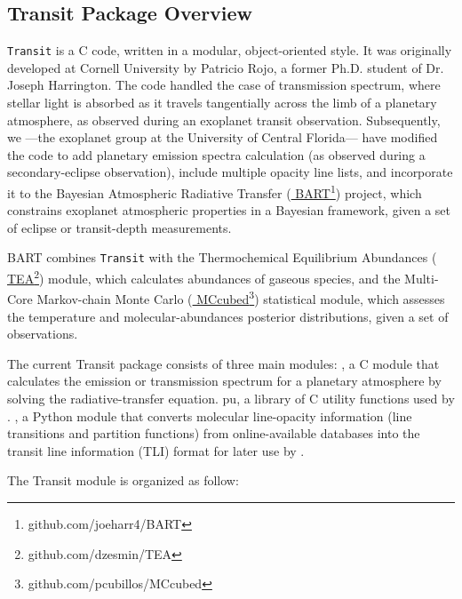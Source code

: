 \documentclass[letterpaper, 12pt]{article}
\begin{document}
\subsection{Transit Package Overview}

{\tt Transit} is a C code, written in a modular, object-oriented
style.  It was originally developed at Cornell University by Patricio
Rojo, a former Ph.D. student of Dr. Joseph Harrington.  The code
handled the case of transmission spectrum, where stellar light is
absorbed as it travels tangentially across the limb of a planetary
atmosphere, as observed during an exoplanet transit observation.
Subsequently, we ---the exoplanet group at the University of Central
Florida--- have modified the code to add planetary emission spectra
calculation (as observed during a secondary-eclipse observation),
include multiple opacity line lists, and incorporate it to the
Bayesian Atmospheric Radiative Transfer
(\href{https://github.com/joeharr4/BART} {\tttm
  BART}\footnote{github.com/joeharr4/BART}) project, which constrains
exoplanet atmospheric properties in a Bayesian framework, given a set
of eclipse or transit-depth measurements.
  

{\tttm BART} combines {\tt Transit} with the Thermochemical
Equilibrium Abundances (\href{https://github.com/dzesmin/TEA} {\tttm
  TEA}\footnote{github.com/dzesmin/TEA}) module, which calculates
abundances of gaseous species, and the Multi-Core Markov-chain Monte
Carlo (\href{https://github.com/pcubillos/MCcubed} {\tttm
  MCcubed}\footnote{github.com/pcubillos/MCcubed}) statistical module,
which assesses the temperature and molecular-abundances posterior
distributions, given a set of observations.

The current {\tttm Transit} package consists of three main modules:
{\transit} , a C module that
calculates the emission or transmission spectrum for a planetary
atmosphere by solving the radiative-transfer equation.
{\tttm pu}, a library of C utility functions used by {\transit}.
{\pylineread}, a Python module that converts molecular line-opacity
information (line transitions and partition functions)
from online-available databases into the transit line information
(TLI) format for later use by {\transit}. \newline

\noindent The Transit module is organized as follow: 

\vspace{0.7cm}
\end{document}

